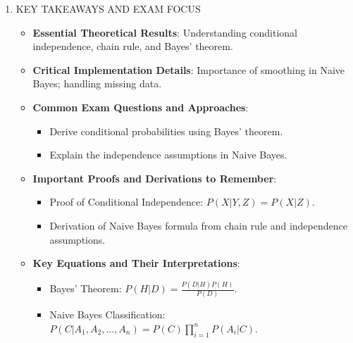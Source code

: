 \documentclass[
  12pt,
]{report}
\providecommand{\tightlist}{%
  \setlength{\itemsep}{0pt}\setlength{\parskip}{0pt}}
\begin{document}
\begin{enumerate}
  \begin{itemize}
  \tightlist
  \item
    \textbf{Example}: Spam detection using Naive Bayes, predicting if an email is spam based on word frequencies.
  \item
    \textbf{Implementation Variations}: Smoothing techniques to handle unseen attribute values.
  \item
    \textbf{Performance Comparisons}: Naive Bayes is competitive in many scenarios despite independence assumptions.
  \item
    \textbf{Limitations and Considerations}: Assumes feature independence, which can lead to inaccuracies in probability estimation.
  \end{itemize}
\item
  KEY TAKEAWAYS AND EXAM FOCUS

  \begin{itemize}
  \tightlist
  \item
    \textbf{Essential Theoretical Results}: Understanding conditional independence, chain rule, and Bayes' theorem.
  \item
    \textbf{Critical Implementation Details}: Importance of smoothing in Naive Bayes; handling missing data.
  \item
    \textbf{Common Exam Questions and Approaches}:

    \begin{itemize}
    \tightlist
    \item
      Derive conditional probabilities using Bayes' theorem.
    \item
      Explain the independence assumptions in Naive Bayes.
    \end{itemize}
  \item
    \textbf{Important Proofs and Derivations to Remember}:

    \begin{itemize}
    \tightlist
    \item
      Proof of Conditional Independence: \(P(X | Y, Z) = P(X | Z)\).
    \item
      Derivation of Naive Bayes formula from chain rule and independence assumptions.
    \end{itemize}
  \item
    \textbf{Key Equations and Their Interpretations}:

    \begin{itemize}
    \tightlist
    \item
      Bayes' Theorem: \(P(H | D) = \frac{P(D | H)P(H)}{P(D)}\).
    \item
      Naive Bayes Classification: \(P(C | A_1, A_2, \ldots, A_n) = P(C) \prod_{i=1}^{n} P(A_i | C)\).
    \end{itemize}
  \end{itemize}
\end{enumerate}
\end{document}
